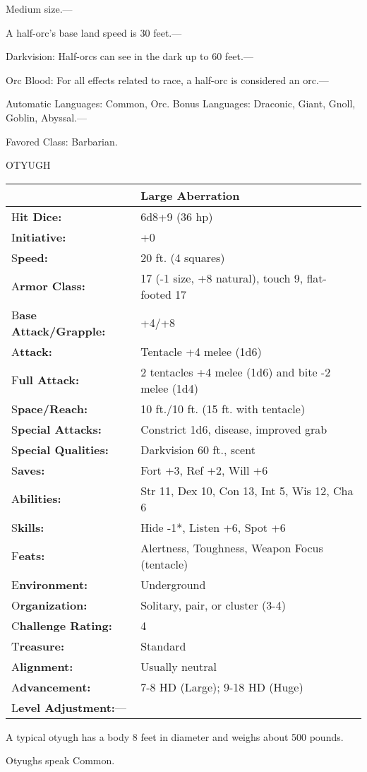 \documentclass{article}
\begin{document}
\parindent=0pt
Medium size.---

A half-orc's base land speed is 30 feet.---

Darkvision: Half-orcs can see in the dark up to 60 feet.---

Orc Blood: For all effects related to race, a half-orc is considered an orc.---

Automatic Languages: Common, Orc. Bonus Languages: Draconic, Giant, Gnoll, Goblin, 
Abyssal.---

Favored Class: Barbarian.

\vspace{12pt}
{\LARGE{}OTYUGH}

\begin{tabular}{|>{\raggedright}p{91pt}|>{\raggedright}p{202pt}|}
\hline
  & Large Aberration\tabularnewline
\hline
H\textbf{it Dice:} & 6d8+9 (36 hp)\tabularnewline
\hline
I\textbf{nitiative:} & +0\tabularnewline
\hline
S\textbf{peed:} & 20 ft. (4 squares)\tabularnewline
\hline
A\textbf{rmor Class:} & 17 (-1 size, +8 natural), touch 9, flat-footed 17\tabularnewline
\hline
B\textbf{ase Attack/Grapple:} & +4/+8\tabularnewline
\hline
A\textbf{ttack:} & Tentacle +4 melee (1d6)\tabularnewline
\hline
F\textbf{ull Attack:} & 2 tentacles +4 melee (1d6) and bite -2 melee (1d4)\tabularnewline
\hline
S\textbf{pace/Reach:} & 10 ft./10 ft. (15 ft. with tentacle)\tabularnewline
\hline
S\textbf{pecial Attacks:} & Constrict 1d6, disease, improved grab\tabularnewline
\hline
S\textbf{pecial Qualities:} & Darkvision 60 ft., scent\tabularnewline
\hline
S\textbf{aves:} & Fort +3, Ref +2, Will +6\tabularnewline
\hline
A\textbf{bilities:} & Str 11, Dex 10, Con 13, Int 5, Wis 12, Cha 6\tabularnewline
\hline
S\textbf{kills:} & Hide -1*, Listen +6, Spot +6\tabularnewline
\hline
F\textbf{eats:} & Alertness, Toughness, Weapon Focus (tentacle)\tabularnewline
\hline
E\textbf{nvironment:} & Underground\tabularnewline
\hline
O\textbf{rganization:} & Solitary, pair, or cluster (3-4)\tabularnewline
\hline
C\textbf{hallenge Rating:} & 4\tabularnewline
\hline
T\textbf{reasure:} & Standard\tabularnewline
\hline
A\textbf{lignment:} & Usually neutral\tabularnewline
\hline
A\textbf{dvancement:} & 7-8 HD (Large); 9-18 HD (Huge)\tabularnewline
\hline
L\textbf{evel Adjustment:}--- & \tabularnewline
\hline
\end{tabular}

A typical otyugh has a body 8 feet in diameter and weighs about 500 pounds.

Otyughs speak Common.
\end{document}
